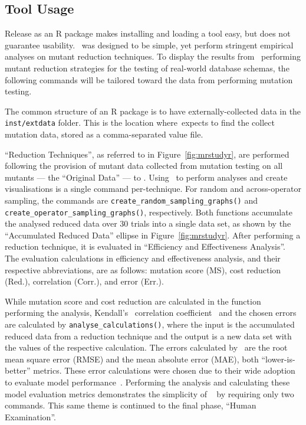 \subsection{Tool Usage}



Release as an R package makes installing and loading a tool easy, but does not guarantee usability.
\mr~was designed to be simple, yet perform stringent empirical analyses on mutant reduction techniques.
To display the results from \mr~performing mutant reduction strategies for the testing of real-world
database schemas, the following commands will be tailored toward the data from performing mutation
testing.

The common structure of an R package is to have externally-collected data in the \texttt{inst/extdata}
folder. This is the location where~\mr expects to find the collect mutation data, stored as a
comma-separated value file.

``Reduction Techniques'', as referred to in Figure~\ref{fig:mrstudyr}, are performed following the
provision of mutant data collected from mutation testing on all mutants --- the ``Original Data'' ---
to \mr. Using \mr~to perform analyses and create visualisations is a single command per-technique.
For random and across-operator sampling, the commands are {\texttt{create\_random\_sampling\_graphs()}}
and {\texttt{create\_operator\_sampling\_graphs()}}, respectively. Both functions accumulate the analysed
reduced data over 30 trials into a single data set, as shown by the ``Accumulated Reduced Data'' ellipse
in Figure~\ref{fig:mrstudyr}. After performing a reduction technique, it is evaluated in ``Efficiency and
Effectiveness Analysis''. The evaluation calculations in efficiency and effectiveness analysis, and their
respective abbreviations, are as follows: mutation score (MS), cost reduction (Red.), correlation (Corr.),
and error (Err.).


While mutation score and cost reduction are calculated in the function performing the analysis, Kendall's
\taub~correlation coefficient~\cite{mcminn2016virtual} and the chosen errors are calculated by
\texttt{analyse\_calculations()}, where the input is the accumulated reduced data from a reduction technique
and the output is a new data set with the values of the respective calculation.  The errors calculated by
\mr~are the root mean square error (RMSE) and the mean absolute error (MAE), both ``lower-is-better'' metrics.
These error calculations were chosen due to their wide adoption to evaluate model performance~\cite{chai2014root}.
Performing the analysis and calculating these model evaluation metrics demonstrates the simplicity of \mr~ by
requiring only two commands. This same theme is continued to the final phase, ``Human Examination''.

